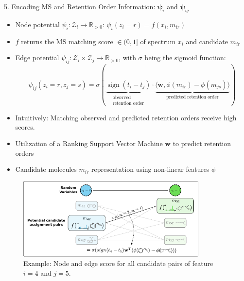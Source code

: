 \documentclass{beamer}
\newcommand{\ms}{MS}
\DeclareMathOperator{\sign}{sign}
\begin{document}
\begin{frame}{}
\begin{columns}[T]
    \begin{block}{{\normalsize 5. Encoding \ms{} and Retention Order Information: $\boldsymbol{\psi}_i$ and $\boldsymbol{\psi}_{ij}$}}
    \begin{itemize}
        \item Node potential $\psi_i:\mathcal{Z}_i\rightarrow\mathbb{R}_{>0}$: $\psi_i(z_i=r)=f(x_i,m_{ir})$
        \item $f$ returns the \ms{} matching score $\in(0,1]$ of spectrum $x_i$ and candidate $m_{ir}$
        \item Edge potential $\psi_{ij}:\mathcal{Z}_i\times\mathcal{Z}_j\rightarrow\mathbb{R}_{>0}$, with $\sigma$ being the sigmoid function:
            \begin{equation}
                \psi_{ij}(z_i=r,z_j=s)=\sigma(\underbrace{\sign(t_i-t_j)}_{\substack{\text{observed}\\ \text{retention order}}}\cdot\underbrace{\langle\mathbf{w},\phi(m_{ir})-\phi(m_{js})\rangle}_{\text{predicted retention order}})
            \end{equation}
        \item Intuitively: Matching observed and predicted retention orders receive high scores.
        \item Utilization of a Ranking Support Vector Machine $\mathbf{w}$ to predict retention orders \cite{Bach2018}
        \item Candidate molecules $m_{ir}$ representation using non-linear features $\phi$ 
    \end{itemize}
    \vspace{0.25cm}
    \begin{figure}
        \centering
        \includegraphics[width=0.85\textwidth]{images/node_and_edge_scores.pdf}
        \caption{Example: Node and edge score for all candidate pairs of feature $i=4$ and $j=5$.}
    \end{figure}
    \end{block}


\hfill
{}


\end{columns}
\end{frame}
\end{document}
